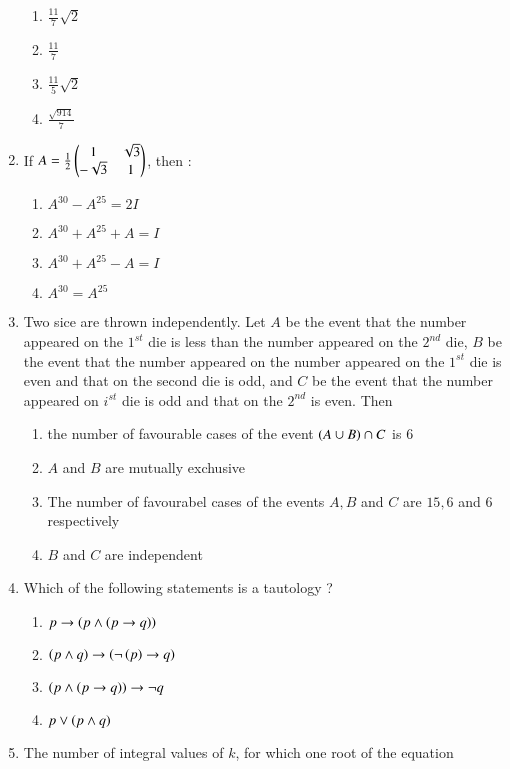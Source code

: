 \documentclass[journal]{IEEEtran}
\begin{document}
\begin{enumerate}
		\begin{enumerate}
			\item $\frac{11}{7}\sqrt{2}$
			\item $\frac{11}{7}$
			\item $\frac{11}{5}\sqrt{2}$
			\item $\frac{\sqrt{914}}{7}$
		\end{enumerate}
	\item If $A=\frac{1}{2}\begin{pmatrix}1&\sqrt{3}\\-\sqrt{3}&1\end{pmatrix}$, then :
		\begin{enumerate}
			\item $A^{30}-A^{25}=2I$
			\item $A^{30}+A^{25}+A=I$
			\item $A^{30}+A^{25}-A=I$
	                \item $A^{30}=A^{25}$
        	\end{enumerate}
	\item Two sice are thrown independently. Let $A$ be the event that the number appeared on the $1^{st}$ die is less than the number appeared on the $2^{nd}$ die, $B$ be the event that the number appeared on the number appeared on the $1^{st}$ die is even and that on the second die is odd, and $C$ be the event that the number appeared on $i^{st}$ die is odd and that on the $2^{nd}$ is even. Then
		\begin{enumerate}
			\item the number of favourable cases of the event $\left(A \cup B\right)\cap C$ is $6$
			\item $A$ and $B$ are mutually exchusive 
			\item The number of favourabel cases of the events $A,B$ and $C$ are $15,6$ and $6$ respectively 
			\item $B$ and $C$ are independent
        	\end{enumerate}	
	\item Which of the following statements is a tautology ?
		\begin{enumerate}
			\item $p \rightarrow \left(p\wedge \left(p \rightarrow q\right)\right)$
			\item $\left(p\wedge q\right)\rightarrow \left(\neg\left(p\right)\rightarrow q\right)$
			\item $\left(p\wedge \left(p \rightarrow q\right)\right)\rightarrow \neg q$
			\item $p \lor \left(p \wedge q\right)$
        	\end{enumerate}
	\item The number of integral values of $k$, for which one root of the equation 

\end{enumerate}
\end{document}
